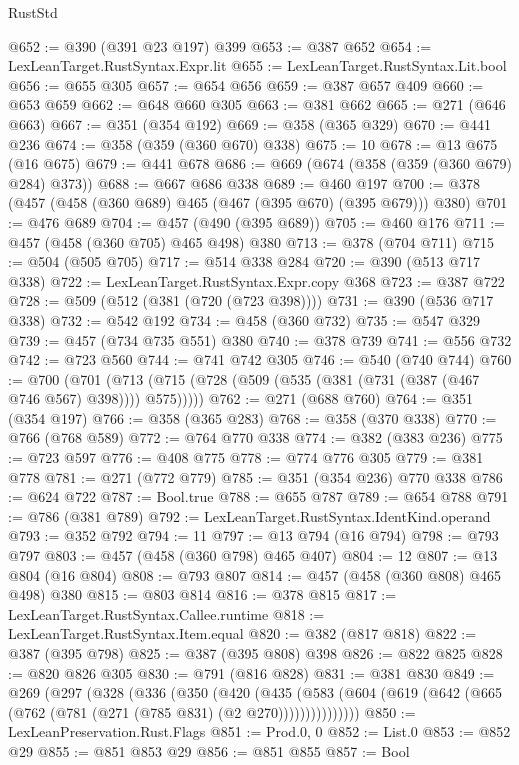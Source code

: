\begin{lexlean}{RustStd}
\begin{coremodule}
@652 := @390 (@391 @23 @197) @399
@653 := @387 @652
@654 := LexLeanTarget.RustSyntax.Expr.lit
@655 := LexLeanTarget.RustSyntax.Lit.bool
@656 := @655 @305
@657 := @654 @656
@659 := @387 @657 @409
@660 := @653 @659
@662 := @648 @660 @305
@663 := @381 @662
@665 := @271 (@646 @663)
@667 := @351 (@354 @192)
@669 := @358 (@365 @329)
@670 := @441 @236
@674 := @358 (@359 (@360 @670) @338)
@675 := 10
@678 := @13 @675 (@16 @675)
@679 := @441 @678
@686 := @669 (@674 (@358 (@359 (@360 @679) @284) @373))
@688 := @667 @686 @338
@689 := @460 @197
@700 := @378 (@457 (@458 (@360 @689) @465 (@467 (@395 @670) (@395 @679))) @380)
@701 := @476 @689
@704 := @457 (@490 (@395 @689))
@705 := @460 @176
@711 := @457 (@458 (@360 @705) @465 @498) @380
@713 := @378 (@704 @711)
@715 := @504 (@505 @705)
@717 := @514 @338 @284
@720 := @390 (@513 @717 @338)
@722 := LexLeanTarget.RustSyntax.Expr.copy @368
@723 := @387 @722
@728 := @509 (@512 (@381 (@720 (@723 @398))))
@731 := @390 (@536 @717 @338)
@732 := @542 @192
@734 := @458 (@360 @732)
@735 := @547 @329
@739 := @457 (@734 @735 @551) @380
@740 := @378 @739
@741 := @556 @732
@742 := @723 @560
@744 := @741 @742 @305
@746 := @540 (@740 @744)
@760 := @700
    (@701 (@713 (@715 (@728 (@509 (@535 (@381 (@731 (@387 (@467 @746 @567) @398)))) @575)))))
@762 := @271 (@688 @760)
@764 := @351 (@354 @197)
@766 := @358 (@365 @283)
@768 := @358 (@370 @338)
@770 := @766 (@768 @589)
@772 := @764 @770 @338
@774 := @382 (@383 @236)
@775 := @723 @597
@776 := @408 @775
@778 := @774 @776 @305
@779 := @381 @778
@781 := @271 (@772 @779)
@785 := @351 (@354 @236) @770 @338
@786 := @624 @722
@787 := Bool.true
@788 := @655 @787
@789 := @654 @788
@791 := @786 (@381 @789)
@792 := LexLeanTarget.RustSyntax.IdentKind.operand
@793 := @352 @792
@794 := 11
@797 := @13 @794 (@16 @794)
@798 := @793 @797
@803 := @457 (@458 (@360 @798) @465 @407)
@804 := 12
@807 := @13 @804 (@16 @804)
@808 := @793 @807
@814 := @457 (@458 (@360 @808) @465 @498) @380
@815 := @803 @814
@816 := @378 @815
@817 := LexLeanTarget.RustSyntax.Callee.runtime
@818 := LexLeanTarget.RustSyntax.Item.equal
@820 := @382 (@817 @818)
@822 := @387 (@395 @798)
@825 := @387 (@395 @808) @398
@826 := @822 @825
@828 := @820 @826 @305
@830 := @791 (@816 @828)
@831 := @381 @830
@849 := @269
    (@297
      (@328
        (@336
          (@350
            (@420
              (@435
                (@583 (@604 (@619 (@642 (@665 (@762 (@781 (@271 (@785 @831) (@2 @270)))))))))))))))
@850 := LexLeanPreservation.Rust.Flags
@851 := Prod.{0, 0}
@852 := List.{0}
@853 := @852 @29
@855 := @851 @853 @29
@856 := @851 @855
@857 := Bool

\end{coremodule}
\end{lexlean}

